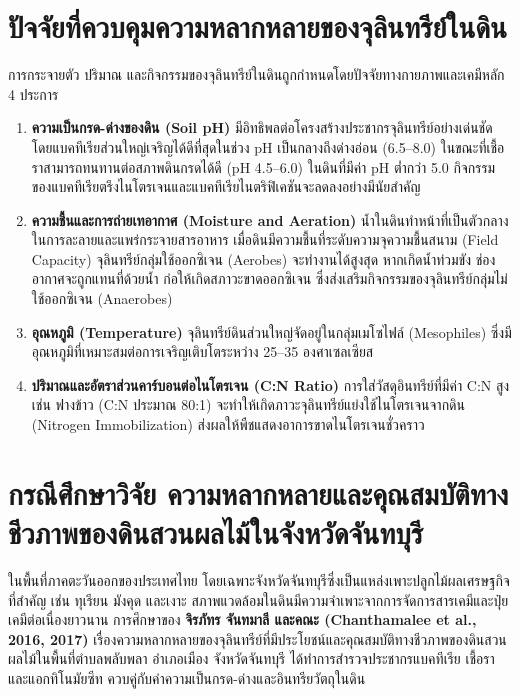 \section{ปัจจัยที่ควบคุมความหลากหลายของจุลินทรีย์ในดิน}

การกระจายตัว ปริมาณ และกิจกรรมของจุลินทรีย์ในดินถูกกำหนดโดยปัจจัยทางกายภาพและเคมีหลัก 4 ประการ
\begin{enumerate}
    \item \textbf{ความเป็นกรด-ด่างของดิน (Soil pH)} มีอิทธิพลต่อโครงสร้างประชากรจุลินทรีย์อย่างเด่นชัด โดยแบคทีเรียส่วนใหญ่เจริญได้ดีที่สุดในช่วง pH เป็นกลางถึงด่างอ่อน (6.5--8.0) ในขณะที่เชื้อราสามารถทนทานต่อสภาพดินกรดได้ดี (pH 4.5--6.0) ในดินที่มีค่า pH ต่ำกว่า 5.0 กิจกรรมของแบคทีเรียตรึงไนโตรเจนและแบคทีเรียไนตริฟิเคชันจะลดลงอย่างมีนัยสำคัญ
    \item \textbf{ความชื้นและการถ่ายเทอากาศ (Moisture and Aeration)} น้ำในดินทำหน้าที่เป็นตัวกลางในการละลายและแพร่กระจายสารอาหาร เมื่อดินมีความชื้นที่ระดับความจุความชื้นสนาม (Field Capacity) จุลินทรีย์กลุ่มใช้ออกซิเจน (Aerobes) จะทำงานได้สูงสุด หากเกิดน้ำท่วมขัง ช่องอากาศจะถูกแทนที่ด้วยน้ำ ก่อให้เกิดสภาวะขาดออกซิเจน ซึ่งส่งเสริมกิจกรรมของจุลินทรีย์กลุ่มไม่ใช้ออกซิเจน (Anaerobes)
    \item \textbf{อุณหภูมิ (Temperature)} จุลินทรีย์ดินส่วนใหญ่จัดอยู่ในกลุ่มเมโซไฟล์ (Mesophiles) ซึ่งมีอุณหภูมิที่เหมาะสมต่อการเจริญเติบโตระหว่าง 25--35 องศาเซลเซียส
    \item \textbf{ปริมาณและอัตราส่วนคาร์บอนต่อไนโตรเจน (C:N Ratio)} การใส่วัสดุอินทรีย์ที่มีค่า C:N สูง เช่น ฟางข้าว (C:N ประมาณ 80:1) จะทำให้เกิดภาวะจุลินทรีย์แย่งใช้ไนโตรเจนจากดิน (Nitrogen Immobilization) ส่งผลให้พืชแสดงอาการขาดไนโตรเจนชั่วคราว
\end{enumerate}

\section{กรณีศึกษาวิจัย ความหลากหลายและคุณสมบัติทางชีวภาพของดินสวนผลไม้ในจังหวัดจันทบุรี}

ในพื้นที่ภาคตะวันออกของประเทศไทย โดยเฉพาะจังหวัดจันทบุรีซึ่งเป็นแหล่งเพาะปลูกไม้ผลเศรษฐกิจที่สำคัญ เช่น ทุเรียน มังคุด และเงาะ สภาพแวดล้อมในดินมีความจำเพาะจากการจัดการสารเคมีและปุ๋ยเคมีต่อเนื่องยาวนาน การศึกษาของ \textbf{จิรภัทร จันทมาลี และคณะ (Chanthamalee et al., 2016, 2017)} เรื่องความหลากหลายของจุลินทรีย์ที่มีประโยชน์และคุณสมบัติทางชีวภาพของดินสวนผลไม้ในพื้นที่ตำบลพลับพลา อำเภอเมือง จังหวัดจันทบุรี ได้ทำการสำรวจประชากรแบคทีเรีย เชื้อรา และแอกทิโนมัยซีท ควบคู่กับค่าความเป็นกรด-ด่างและอินทรียวัตถุในดิน

